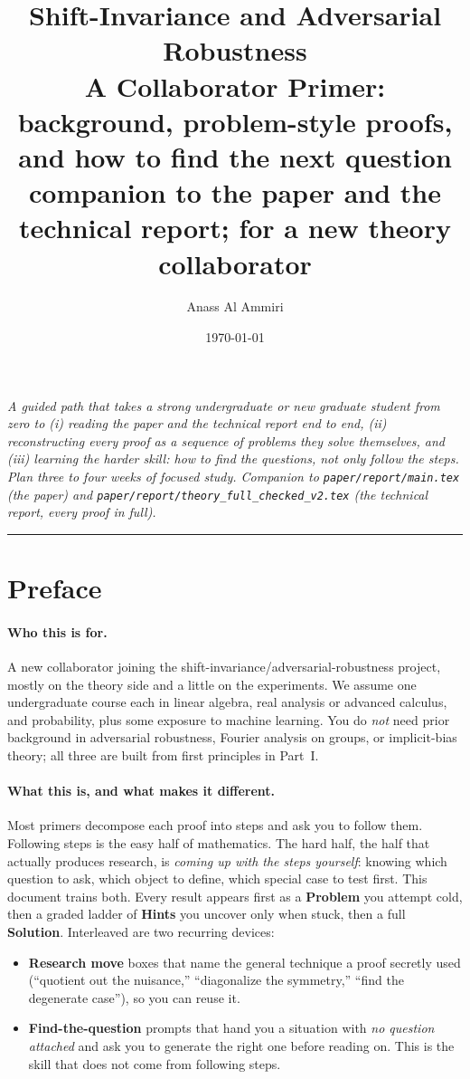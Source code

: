 \documentclass[11pt]{article}
\title{\textbf{Shift-Invariance and Adversarial Robustness}\\[3pt]
\large A Collaborator Primer: background, problem-style proofs, and how to find the next question\\[4pt]
\normalsize companion to the paper and the technical report; for a new theory collaborator}
\author{Anass Al Ammiri}
\date{\today}
\theoremstyle{plain}
\theoremstyle{definition}
\theoremstyle{remark}
\begin{document}
\maketitle

\begin{center}\small\itshape
A guided path that takes a strong undergraduate or new graduate student from zero to (i) reading the paper and
the technical report end to end, (ii) reconstructing every proof as a sequence of problems they solve themselves,
and (iii) learning the harder skill: how to find the questions, not only follow the steps. Plan three to four weeks
of focused study. Companion to \texttt{paper/report/main.tex} (the paper) and \texttt{paper/report/theory\_full\_checked\_v2.tex}
(the technical report, every proof in full).
\end{center}

\medskip\hrule\medskip

\section*{Preface}

\paragraph{Who this is for.} A new collaborator joining the shift-invariance/adversarial-robustness project,
mostly on the theory side and a little on the experiments. We assume one undergraduate course each in linear
algebra, real analysis or advanced calculus, and probability, plus some exposure to machine learning. You do
\emph{not} need prior background in adversarial robustness, Fourier analysis on groups, or implicit-bias theory;
all three are built from first principles in Part~I.

\paragraph{What this is, and what makes it different.} Most primers decompose each proof into steps and ask you to
follow them. Following steps is the easy half of mathematics. The hard half, the half that actually produces
research, is \emph{coming up with the steps yourself}: knowing which question to ask, which object to define,
which special case to test first. This document trains both. Every result appears first as a \textbf{Problem} you
attempt cold, then a graded ladder of \textbf{Hints} you uncover only when stuck, then a full \textbf{Solution}.
Interleaved are two recurring devices:
\begin{itemize}[leftmargin=1.4em,nosep]
\item \textbf{Research move} boxes that name the general technique a proof secretly used (``quotient out the
nuisance,'' ``diagonalize the symmetry,'' ``find the degenerate case''), so you can reuse it.
\item \textbf{Find-the-question} prompts that hand you a situation with \emph{no question attached} and ask you to
generate the right one before reading on. This is the skill that does not come from following steps.
\end{itemize}
\end{document}
